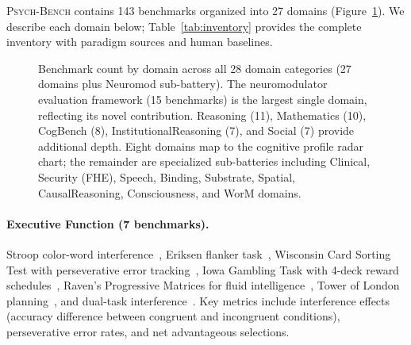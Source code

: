 \documentclass[11pt,letterpaper]{article}
\newcommand{\psychbench}{\textsc{Psych-Bench}}
\begin{document}
\psychbench{} contains 143 benchmarks organized into 27 domains (Figure~\ref{fig:domain_matrix}). We describe each domain below; Table~\ref{tab:inventory} provides the complete inventory with paradigm sources and human baselines.

\begin{figure}[t]
\centering
{}
\caption{Benchmark count by domain across all 28 domain categories (27 domains plus Neuromod sub-battery). The neuromodulator evaluation framework (15 benchmarks) is the largest single domain, reflecting its novel contribution. Reasoning (11), Mathematics (10), CogBench (8), InstitutionalReasoning (7), and Social (7) provide additional depth. Eight domains map to the cognitive profile radar chart; the remainder are specialized sub-batteries including Clinical, Security (FHE), Speech, Binding, Substrate, Spatial, CausalReasoning, Consciousness, and WorM domains.}
\label{fig:domain_matrix}
\end{figure}

\paragraph{Executive Function (7 benchmarks).} Stroop color-word interference~\citep{stroop1935interference,macleod1991half}, Eriksen flanker task~\citep{eriksen1974effects}, Wisconsin Card Sorting Test with perseverative error tracking~\citep{berg1948simple}, Iowa Gambling Task with 4-deck reward schedules~\citep{bechara1994insensitivity}, Raven's Progressive Matrices for fluid intelligence~\citep{raven1938progressive}, Tower of London planning~\citep{shallice1982specific}, and dual-task interference~\citep{pashler1994dual}. Key metrics include interference effects (accuracy difference between congruent and incongruent conditions), perseverative error rates, and net advantageous selections.
\end{document}
